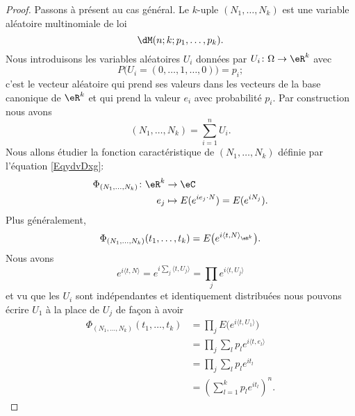 \begin{proof}
    Passons à présent au cas général. Le \( k\)-uple \( (N_1,\ldots, N_k)\) est une variable aléatoire multinomiale de loi
    \begin{equation}
        \dM(n;k;p_1,\ldots, p_k).
    \end{equation}
    Nous introduisons les variables aléatoires \( U_i\) données par \( U_i\colon \Omega\to \eR^k\) avec
    \begin{equation}
        P\big( U_i=(0,\ldots, 1,\ldots, 0) \big)=p_i;
    \end{equation}
    c'est le vecteur aléatoire qui prend ses valeurs dans les vecteurs de la base canonique de \( \eR^k\) et qui prend la valeur \( e_i\) avec probabilité \( p_i\). Par construction nous avons
    \begin{equation}
        (N_1,\ldots, N_k)=\sum_{i=1}^nU_i.
    \end{equation}
    Nous allons étudier la fonction caractéristique de \( (N_1,\ldots, N_k)\) définie par l'équation \eqref{EqydvDxg}:
    \begin{equation}
        \begin{aligned}
            \Phi_{(N_1,\ldots, N_k)}\colon\eR^k &\to \eC \\
            e_j&\mapsto E( e^{ie_j\cdot N})=E( e^{iN_j}).
        \end{aligned}
    \end{equation}
    Plus généralement,
    \begin{equation}
        \Phi_{(N_1,\ldots, N_k)}(t_1,\ldots, t_k)=E\big(  e^{i\langle t, N\rangle_{\eR^k} } \big).
    \end{equation}
    Nous avons
    \begin{equation}
        e^{i\langle t, N\rangle }= e^{i\sum_j\langle t, U_j\rangle }=\prod_j e^{i\langle t, U_j\rangle }
    \end{equation}
    et vu que les \( U_i\) sont indépendantes et identiquement distribuées nous pouvons écrire \( U_1\) à la place de \( U_j\) de façon à avoir
    \begin{subequations}    \label{EqOhTHia}
        \begin{align}
            \Phi_{(N_1,\ldots, N_k)}(t_1,\ldots, t_k)&=\prod_{j}E\big(  e^{i\langle t, U_1\rangle } \big)\\
            &=\prod_j\sum_lp_l e^{i\langle t, e_l\rangle }\\
            &=\prod_j\sum_lp_l e^{it_l}\\
            &=\left( \sum_{l=1}^kp_l e^{it_l} \right)^n.
        \end{align}

\end{subequations}
\end{proof}
